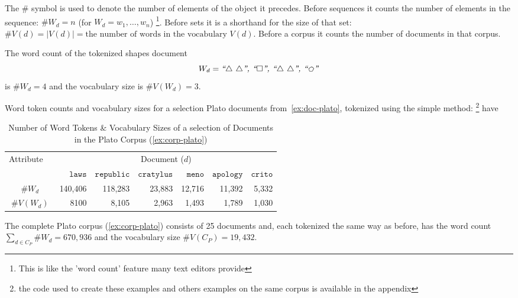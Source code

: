 \begin{definition}[$\#$ Operator]
  The $\#$ symbol is used to denote the number of elements of the object it precedes. Before sequences it counts the number of elements in the sequence: $\#W_d=n$ (for $W_d=w_1,\dots,w_n$) \footnote{This is like the 'word count' feature many text editors provide}. Before sets it is a shorthand for the size of that set: $\#V(d)=|V(d)|=\text{the number of words in the vocabulary $V(d)$}$. Before a corpus it counts the number of documents in that corpus.
\end{definition}

\begin{example}
  The word count of the tokenized shapes document $$W_d=\text{\emph{``$\triangle$ $\triangle$'', ``$\square$'', ``$\triangle$ $\triangle$'', ``$\pentagon$''}}$$ is $\#W_d=4$ and the vocabulary size is $\#V(W_d)=3$.
\end{example}
\vspace{6pt}

\begin{example}
  Word token counts and vocabulary sizes for a selection Plato documents from~\ref{ex:doc-plato}, tokenized using the simple method: \footnote{the code used to create these examples and others examples on the same corpus is available in the appendix} have 
  \vspace{6pt}
  \begin{table}[h]
    \centering
    \begin{tabular}{c r r r r r r}
      \toprule
      \multicolumn{1}{c}{Attribute$\quad$} &
      \multicolumn{6}{c}{Document ($d$)} \\

      \cmidrule(lr){2-7}
      &
      $\texttt{laws}$ &
      $\texttt{republic}$ &
      $\texttt{cratylus}$ &
      $\texttt{meno}$ &
      $\texttt{apology}$ &
      $\texttt{crito}$ \\
      \midrule
      $\#W_d$ & 140,406 & 118,283 & 23,883 & 12,716 & 11,392 & 5,332\\
      $\#V(W_d)$ & 8100 & 8,105 & 2,963 & 1,493 & 1,789 & 1,030\\
      \bottomrule
    \end{tabular}
    \caption{Number of Word Tokens \& Vocabulary Sizes of a selection of Documents in the Plato Corpus (\autoref{ex:corp-plato})}
  \end{table}
\end{example}
\vspace{6pt}

\begin{example}
  The complete Plato corpus (\ref{ex:corp-plato}) consists of 25 documents and, each tokenized the same way as before, has the word count $\sum_{d\in C_P}\#W_d=670,936$ and the vocabulary size $\#V(C_P)=19,432$.
\end{example}
